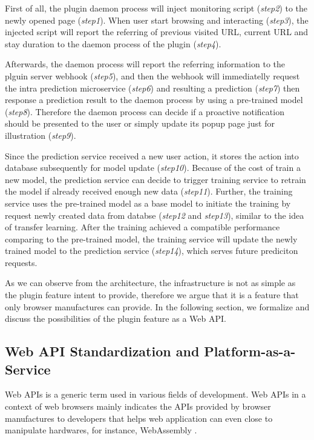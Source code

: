 First of all, the plugin daemon process will inject monitoring script (\emph{step2}) to 
the newly opened page (\emph{step1}).
When user start browsing and interacting (\emph{step3}), the injected script will report the referring of
previous visited URL, current URL and stay duration to the daemon process of the plugin (\emph{step4}).

Afterwards, the daemon process will report the referring information to the plguin server webhook (\emph{step5}),
and then the webhook will immediatelly request the intra prediction microservice (\emph{step6}) and resulting a 
prediction (\emph{step7}) then response a prediction result to the daemon process 
by using a pre-trained model (\emph{step8}). Therefore the daemon process can decide 
if a proactive notification should be presented to the user or simply update its popup page
just for illustration (\emph{step9}).

Since the prediction service received a new user action, it stores the action into database
subsequently for model update (\emph{step10}). Because of the cost of train a new model,
the prediction service can decide to trigger training service to retrain the model 
if already received enough new data (\emph{step11}). 
Further, the training service uses the pre-trained model as
a base model to initiate the training by request newly created data from databse (\emph{step12} and \emph{step13}), 
similar to the idea of transfer learning.
After the training achieved a compatible performance comparing to the pre-trained model,
the training service will update the newly trained model to the prediction service (\emph{step14}), which 
serves future prediciton requests.

As we can observe from the architecture, the infrastructure is not as simple as the plugin feature
intent to provide, therefore we argue that it is a feature that only browser manufactures
can provide. In the following section, we formalize and discuss 
the possibilities of the plugin feature as a Web API.

\subsection{Web API Standardization and Platform-as-a-Service}

Web APIs is a generic term used in various fields of development.
Web APIs in a context of web browsers mainly indicates the APIs provided
by browser manufactures to developers that helps web application can even close
to manipulate hardwares, for instance, WebAssembly \cite{w3c2018ws}.

